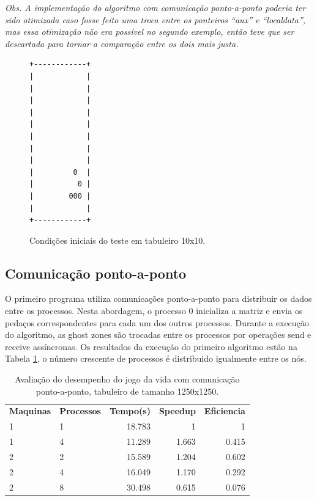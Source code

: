 \documentclass[conference]{IEEEtran}
\begin{document}
\textit{ Obs. A implementação do algoritmo com comunicação ponto-a-ponto poderia ter sido otimizada caso fosse feito uma troca entre os ponteiros ``aux'' e ``localdata'', mas essa otimização não era possível no segundo exemplo, então teve que ser descartada para tornar a comparação entre os dois mais justa. }


\begin{figure}[!htb]
\begin{verbatim}
+------------+
|            |
|            |
|            |
|            |
|            |
|            |
|            |
|            |
|         0  |
|          0 |
|        000 |
|            |
+------------+
\end{verbatim}
\caption{Condições iniciais do teste em tabuleiro 10x10.}
\label{fig:ex02}
\end{figure}

\subsection{Comunicação ponto-a-ponto \label{sec:ex02a}}
O primeiro programa utiliza comunicações ponto-a-ponto para distribuir os dados entre os processos. Nesta abordagem, o processo 0 inicializa a matriz e envia os pedaços correspondentes para cada um dos outros processos. Durante a execução do algoritmo, as ghost zones são trocadas entre os processos por operações send e receive assíncronas. Os resultados da execução do primeiro algoritmo estão na Tabela \ref{tab:ex02a}, o número crescente de processos é distribuido igualmente entre os nós.

\begin{table}[htb!]
  \centering
	\begin{adjustbox}{max width=\linewidth}
	\begin{tabular}{llrrr}%
		\bfseries Maquinas & \bfseries Processos & \bfseries Tempo(s) & \bfseries Speedup & \bfseries Eficiencia  \\
    1 &	1	& 18.783	& 1	    & 1     \\
    1 &	4	& 11.289	& 1.663 & 0.415 \\
    2 &	2	& 15.589	& 1.204 & 0.602 \\
    2 &	4	& 16.049	& 1.170 & 0.292 \\
    2 &	8	& 30.498	& 0.615 &	0.076 \\

	\end{tabular}
	\end{adjustbox}
	\caption{\label{tab:ex02a}Avaliação do desempenho do jogo da vida com comunicação ponto-a-ponto, tabuleiro de tamanho 1250x1250.}
\end{table}
\end{document}
